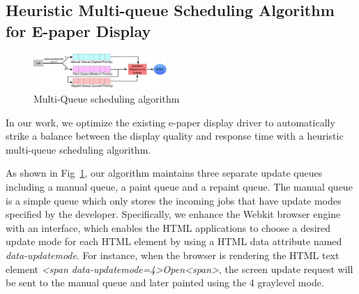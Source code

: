 \documentclass[]{sigchi}
\begin{document}
 

\subsection{Heuristic Multi-queue Scheduling Algorithm for E-paper Display}

\begin{figure}[t]
\begin{center}
\includegraphics[width=0.45\textwidth]{figures/heruist}
\caption{Multi-Queue scheduling algorithm}
\label{fig:Heruist}
\end{center}
\end{figure}
In our work, we optimize the existing e-paper display driver to automatically strike a balance between the display quality and response time with a heuristic multi-queue scheduling algorithm.

As shown in Fig~\ref{fig:Heruist}, our algorithm maintains three separate update queues including a manual queue, a paint queue and a repaint queue. The manual queue is a simple queue which only stores the incoming jobs that have update modes specified by the developer.
Specifically, we enhance the Webkit browser engine with an interface, which enables the HTML applications to choose a desired update mode for each HTML element by using a HTML data attribute named \textit{data-updatemode}. For instance, when the browser is rendering the HTML text element \textit{\textless span data-updatemode=4\textgreater Open\textless span\textgreater}, the screen update request will be sent to the manual queue and later painted using the 4 graylevel mode.


\end{document}
